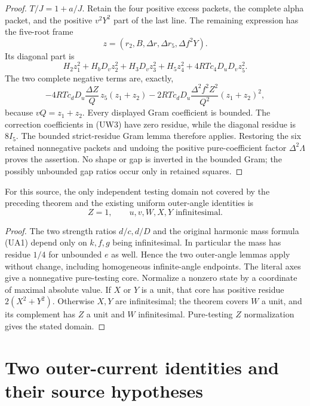 \begin{proof}
$T/J=1+a/J$.  Retain the four positive excess packets, the complete
alpha packet, and the positive $v^2Y^2$ part of the last line.
The remaining expression has the five-root frame
\[
 z=(r_2,B,\Delta r,\Delta r_5,\Delta f^2Y).
\]
Its diagonal part is
\[
 H_2z_1^2+H_bD_vz_2^2+H_3D_vz_3^2+H_5z_4^2
       +4RTc_4D_uD_vz_5^2.
\]
The two complete negative terms are, exactly,
\[
 -4RTc_dD_u\frac{\Delta Z}{Q}\,z_5(z_1+z_2)
 -2RTc_dD_u\frac{\Delta^2f^2Z^2}{Q^2}(z_1+z_2)^2,       \tag{UW3}
\]
because $vQ=z_1+z_2$.  Every displayed Gram coefficient is bounded.
The correction coefficients in (UW3) have zero residue, while the
diagonal residue is $8I_5$.  The bounded strict-residue Gram lemma
therefore applies.  Restoring the six retained nonnegative packets and
undoing the positive pure-coefficient factor $\Delta^2\Lambda$ proves
the assertion.  No shape or gap is inverted in the bounded Gram;
the possibly unbounded gap ratios occur only in retained squares.
\end{proof}

\begin{corollary}
For this source, the only independent testing domain not covered by
the preceding theorem and the existing uniform outer-angle identities
is
\[
 Z=1,\qquad u,v,W,X,Y\text{ infinitesimal}.
\]
\end{corollary}
\begin{proof}
The two strength ratios $d/c,d/D$ and the original harmonic mass
formula (UA1) depend only on $k,f,g$ being infinitesimal.  In particular
the mass has residue $1/4$ for unbounded $e$ as well.  Hence the two
outer-angle lemmas apply without change, including homogeneous
infinite-angle endpoints.  The literal axes give a nonnegative
pure-testing core.  Normalize a nonzero state by a coordinate of
maximal absolute value.  If $X$ or $Y$ is a unit, that core has positive
residue $2(X^2+Y^2)$.  Otherwise $X,Y$ are infinitesimal; the theorem
covers $W$ a unit, and its complement has $Z$ a unit and $W$
infinitesimal.  Pure-testing $Z$ normalization gives the stated domain.
\end{proof}


\section{\texorpdfstring{Two outer-current identities and their source hypotheses}{Two outer-current identities and their source hypotheses}}
\label{component:p6cad7544d1b8}

